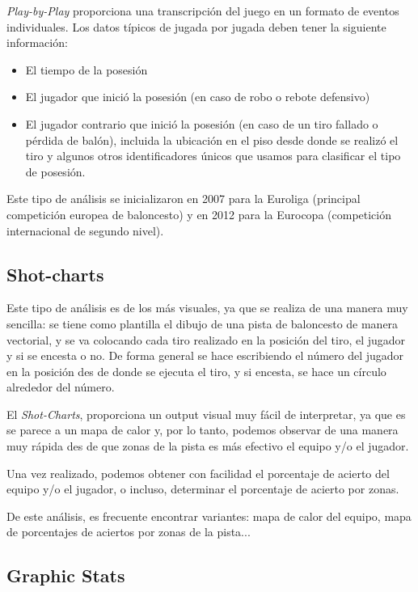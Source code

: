 \documentclass[paper=a4, fontsize=9pt]{article}
\begin{document}
\emph{Play-by-Play} proporciona una transcripción del juego en un formato de eventos individuales. Los datos típicos de jugada por jugada deben tener la siguiente información:
  
  \begin{itemize}
\item El tiempo de la posesión
\item El jugador que inició la posesión (en caso de robo o rebote defensivo)
\item El jugador contrario que inició la posesión (en caso de un tiro fallado o pérdida de balón), incluida la ubicación en el piso desde donde se realizó el tiro y algunos otros identificadores únicos que usamos para clasificar el tipo de posesión.
\end{itemize}

Este tipo de análisis se inicializaron en 2007 para la Euroliga (principal competición europea de baloncesto) y en 2012 para la Eurocopa (competición internacional de segundo nivel).

\clearpage

\subsection{Shot-charts}

Este tipo de análisis es de los más visuales, ya que se realiza de una manera muy sencilla: se tiene como plantilla el dibujo de una pista de baloncesto de manera vectorial, y se va colocando cada tiro realizado en la posición del tiro, el jugador y si se encesta o no. De forma general se hace escribiendo el número del jugador en la posición des de donde se ejecuta el tiro, y si encesta, se hace un círculo alrededor del número.

El \emph{Shot-Charts}, proporciona un output visual muy fácil de interpretar, ya que es se parece a un mapa de calor y, por lo tanto, podemos observar de una manera muy rápida des de que zonas de la pista es más efectivo el equipo y/o el jugador.

Una vez realizado, podemos obtener con facilidad el porcentaje de acierto del equipo y/o el jugador, o incluso, determinar el porcentaje de acierto por zonas.

De este análisis, es frecuente encontrar variantes: mapa de calor del equipo, mapa de porcentajes de aciertos por zonas de la pista...

\subsection{Graphic Stats}
\end{document}
